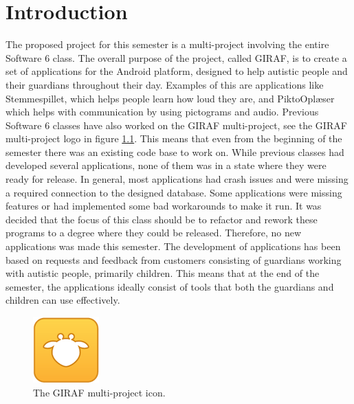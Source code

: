 \chapter{Introduction}\label{chap:introduction}
The proposed project for this semester is a multi-project involving the entire Software 6 class. The overall purpose of the project, called GIRAF, is to create a set of applications for the Android platform, designed to help autistic people and their guardians throughout their day. Examples of this are applications like Stemmespillet, which helps people learn how loud they are, and PiktoOplæser which helps with communication by using pictograms and audio.
Previous Software 6 classes have also worked on the GIRAF multi-project, see the GIRAF multi-project logo in figure \ref{fig:GIRAFlogo}. This means that even from the beginning of the semester there was an existing code base to work on. While previous classes had developed several applications, none of them was in a state where they were ready for release. In general, most applications had crash issues and were missing a required connection to the designed database. Some applications were missing features or had implemented some bad workarounds to make it run. It was decided that the focus of this class should be to refactor and rework these programs to a degree where they could be released. Therefore, no new applications was made this semester.
The development of applications has been based on requests and feedback from customers consisting of guardians working with autistic people, primarily children. This means that at the end of the semester, the applications ideally consist of tools that both the guardians and children can use effectively.

\begin{figure}[H]
	\centering
	\includegraphics[scale=1]{Pics/ic_giraf.png}
	\caption{The GIRAF multi-project icon.}
	\label{fig:GIRAFlogo}
\end{figure}

